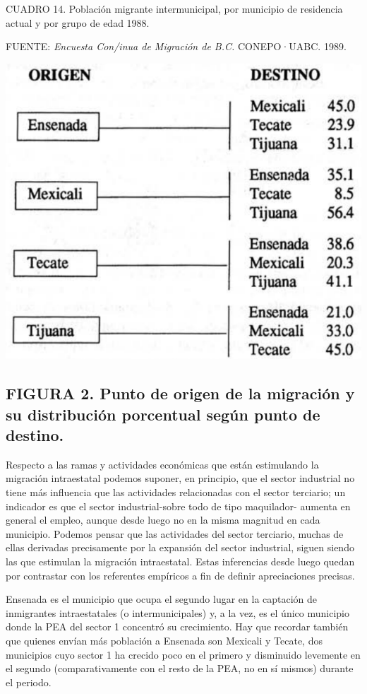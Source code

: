 \documentclass{article}
\begin{document}
CUADRO 14. Población migrante intermunicipal, por municipio de residencia actual y por grupo de edad 1988.

FUENTE: \textit{Encuesta Con/inua de Migración de B.C.} CONEPO·UABC. 1989.


\includegraphics{_page_32_Figure_1.png}


\subsection{FIGURA 2. Punto de origen de la migración y su distribución porcentual según punto de destino.}

Respecto a las ramas y actividades económicas que están estimulando la migración intraestatal podemos suponer, en principio, que el sector industrial no tiene más influencia que las actividades relacionadas con el sector terciario; un indicador es que el sector industrial-sobre todo de tipo maquilador- aumenta en general el empleo, aunque desde luego no en la misma magnitud en cada municipio. Podemos pensar que las actividades del sector terciario, muchas de ellas derivadas precisamente por la expansión del sector industrial, siguen siendo las que estimulan la migración intraestatal. Estas inferencias desde luego quedan por contrastar con los referentes empíricos a fin de definir apreciaciones precisas.

Ensenada es el municipio que ocupa el segundo lugar en la captación de inmigrantes intraestatales (o intermunicipales) y, a la vez, es el único municipio donde la PEA del sector 1 concentró su crecimiento. Hay que recordar también que quienes envían más población a Ensenada son Mexicali y Tecate, dos municipios cuyo sector 1 ha crecido poco en el primero y disminuido levemente en el segundo (comparativamente con el resto de la PEA, no en sí mismos) durante el periodo.
\end{document}
